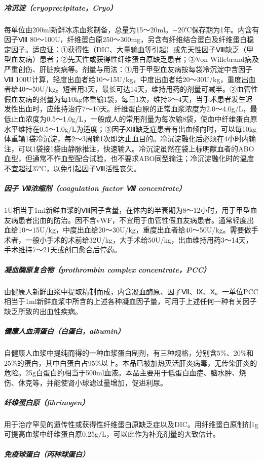 \subparagraph{冷沉淀（cryoprecipitate，Cryo）}

每单位由200ml新鲜冰冻血浆制备，总量为15～20ml。−20℃保存期为1年。内含有因子Ⅷ
80～100U，纤维蛋白原250～300mg，另含有纤维结合蛋白及纤维蛋白稳定因子。适应证：①获得性（DIC、大量输血等引起）或先天性因子Ⅷ缺乏（甲型血友病）患者；②先天性或获得性纤维蛋白原缺乏患者；③Von
Willebrand病及严重创伤、肝脏疾病等。剂量与用法：①用于甲型血友病按每袋冷沉淀中含因子Ⅷ
100U计算，轻度出血者给10～15U/kg，中度出血者给20～30U/kg，重度出血者给40～50U/kg。短者用3天，最长可达14天，维持用药的剂量可减半。②血管性假血友病的剂量为每10kg体重输1袋，每日1次，维持3～4天，当手术患者发生迟发性出血时，应维持治疗7～10天。纤维蛋白原的正常血浆浓度为2.0～4.0g/L，最低止血浓度为0.5～1.0g/L，一般成人的常用剂量为每次输8袋，使血中纤维蛋白原水平维持在0.5～1.0g/L为适度；③因子ⅩⅢ缺乏症患者有出血倾向时，可以每10kg体重输1袋冷沉淀，每2～3周输1次即达止血目的。冷沉淀融化后必须在4小时内输注，可以1袋接1袋由静脉推注，快速输入。冷沉淀虽然在袋上标明献血者的ABO血型，但通常不作血型配合试验，也不要求ABO同型输注；冷沉淀融化时的温度不宜超过37℃，以免引起因子Ⅷ活性丧失。

\subparagraph{因子 Ⅷ浓缩剂（coagulation factor Ⅷ concentrate）}

1U相当于1ml新鲜血浆的Ⅷ因子含量，在体内的半衰期为8～12小时，用于甲型血友病患者出血的防治。因不含vWF，不宜用于血管性假血友病患者。通常轻度出血给10～15U/kg，中度出血给20～30U/kg，重度出血者给40～50U/kg。需要做手术者，一般小手术的术前给32U/kg，大手术给50U/kg，出血维持用药3～14天，手术维持7～21天或创口愈合后停药。

\subparagraph{凝血酶原复合物（prothrombin complex concentrate，PCC）}

由健康人新鲜血浆中提取精制而成，内含凝血酶原、因子Ⅶ、Ⅸ、Ⅹ。一单位PCC相当于1ml新鲜血浆中所含的上述各种凝血因子量，可用于上述任何一种有关因子缺乏所致的出血性疾病。

\subparagraph{健康人血清蛋白（白蛋白，albumin）}

自健康人血浆中提纯而得的一种血浆蛋白制剂，有三种规格，分别含5\%、20\%和25\%的蛋白，其中白蛋白占95\%以上。本品已被加热灭活肝炎病毒，无传染肝炎的危险。25g白蛋白约相当于500ml血液。本品主要用于低蛋白血症、脑水肿、烧伤、休克等，并能使肾小球滤过量增加，促进利尿。

\subparagraph{纤维蛋白原（fibrinogen）}

用于治疗罕见的遗传性或获得性纤维蛋白原缺乏症以及DIC。用纤维蛋白原制剂1g可提高血浆中纤维蛋白原0.25g/L，可以此作为补充剂量的大致估计。

\subparagraph{免疫球蛋白（丙种球蛋白）}

